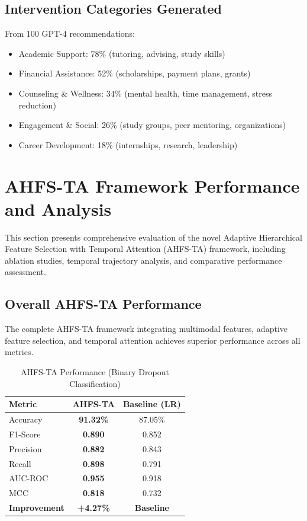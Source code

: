 \subsection{Intervention Categories Generated}

From 100 GPT-4 recommendations:
\begin{itemize}
\item Academic Support: 78\% (tutoring, advising, study skills)
\item Financial Assistance: 52\% (scholarships, payment plans, grants)
\item Counseling \& Wellness: 34\% (mental health, time management, stress reduction)
\item Engagement \& Social: 26\% (study groups, peer mentoring, organizations)
\item Career Development: 18\% (internships, research, leadership)
\end{itemize}

\section{AHFS-TA Framework Performance and Analysis}

This section presents comprehensive evaluation of the novel Adaptive Hierarchical Feature Selection with Temporal Attention (AHFS-TA) framework, including ablation studies, temporal trajectory analysis, and comparative performance assessment.

\subsection{Overall AHFS-TA Performance}

The complete AHFS-TA framework integrating multimodal features, adaptive feature selection, and temporal attention achieves superior performance across all metrics.

\begin{table}[h]
\centering
\caption{AHFS-TA Performance (Binary Dropout Classification)}
\label{tab:ahfsta_perf}
\begin{tabular}{lcc}
\toprule
\textbf{Metric} & \textbf{AHFS-TA} & \textbf{Baseline (LR)} \\
\midrule
Accuracy & \textbf{91.32\%} & 87.05\% \\
F1-Score & \textbf{0.890} & 0.852 \\
Precision & \textbf{0.882} & 0.843 \\
Recall & \textbf{0.898} & 0.791 \\
AUC-ROC & \textbf{0.955} & 0.918 \\
MCC & \textbf{0.818} & 0.732 \\
\midrule
\textbf{Improvement} & \textbf{+4.27\%} & \textbf{Baseline} \\
\bottomrule
\end{tabular}
\end{table}

